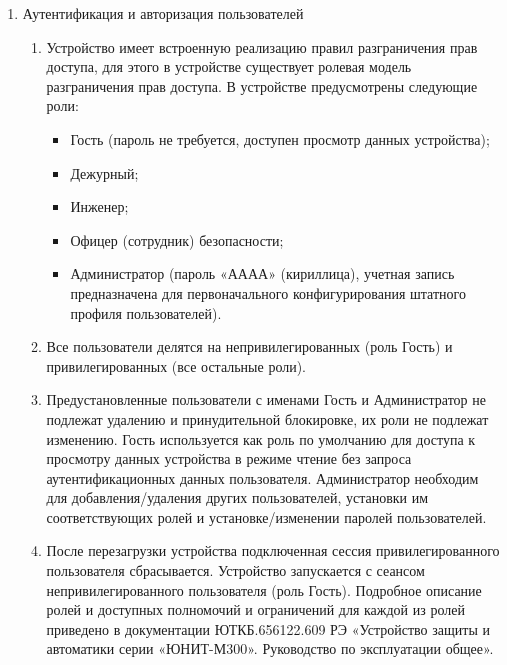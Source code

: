 \begin{enumerate}
\begin{enumerate}
\end{enumerate}

\item Аутентификация и авторизация пользователей
\begin{enumerate}

\item Устройство имеет встроенную реализацию правил разграничения прав доступа, для этого в устройстве существует ролевая модель разграничения прав доступа.
В устройстве предусмотрены следующие роли:
\begin{itemize}
\item Гость (пароль не требуется, доступен просмотр данных устройства);
\item Дежурный;
\item Инженер;
\item Офицер (сотрудник) безопасности;
\item Администратор (пароль «АААА» (кириллица), учетная запись предназначена для первоначального конфигурирования штатного профиля пользователей).
\end{itemize}

\item Все пользователи делятся на непривилегированных (роль Гость) и привилегированных (все остальные роли).

\item
Предустановленные пользователи с именами Гость и Администратор не подлежат удалению и принудительной блокировке, их роли не подлежат изменению. Гость используется как роль по умолчанию для доступа к просмотру данных устройства в режиме чтение без запроса аутентификационных данных пользователя. Администратор необходим для добавления/удаления других пользователей, установки им соответствующих ролей и установке/изменении паролей пользователей.
\item
После перезагрузки устройства подключенная сессия привилегированного пользователя сбрасывается. Устройство запускается с сеансом непривилегированного пользователя (роль Гость).
Подробное описание ролей и доступных полномочий и ограничений для каждой из ролей приведено в документации ЮТКБ.656122.609 РЭ «Устройство защиты и автоматики серии «ЮНИТ-М300». Руководство по эксплуатации общее».


\end{enumerate}
\end{enumerate}
